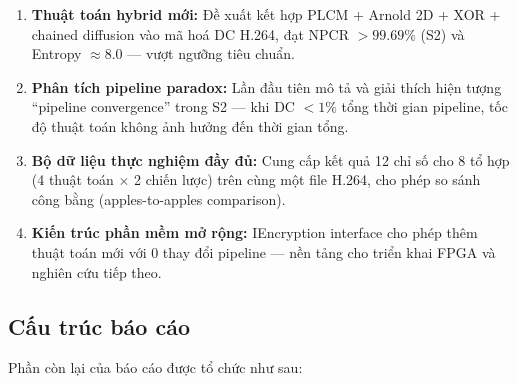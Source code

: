 \begin{enumerate}
  \item \textbf{Thuật toán hybrid mới:} Đề xuất kết hợp PLCM + Arnold 2D + XOR
        + chained diffusion vào mã hoá DC H.264, đạt NPCR $> 99.69\%$ (S2)
        và Entropy $\approx 8.0$ --- vượt ngưỡng tiêu chuẩn.

  \item \textbf{Phân tích pipeline paradox:} Lần đầu tiên mô tả và giải thích
        hiện tượng ``pipeline convergence'' trong S2 --- khi DC $< 1\%$
        tổng thời gian pipeline, tốc độ thuật toán không ảnh hưởng đến thời gian tổng.

  \item \textbf{Bộ dữ liệu thực nghiệm đầy đủ:} Cung cấp kết quả 12 chỉ số
        cho 8 tổ hợp (4 thuật toán $\times$ 2 chiến lược) trên cùng một file
        H.264, cho phép so sánh công bằng (apples-to-apples comparison).

  \item \textbf{Kiến trúc phần mềm mở rộng:} IEncryption interface cho phép
        thêm thuật toán mới với 0 thay đổi pipeline --- nền tảng cho triển khai
        FPGA và nghiên cứu tiếp theo.
\end{enumerate}

\subsection{Cấu trúc báo cáo}

Phần còn lại của báo cáo được tổ chức như sau:

